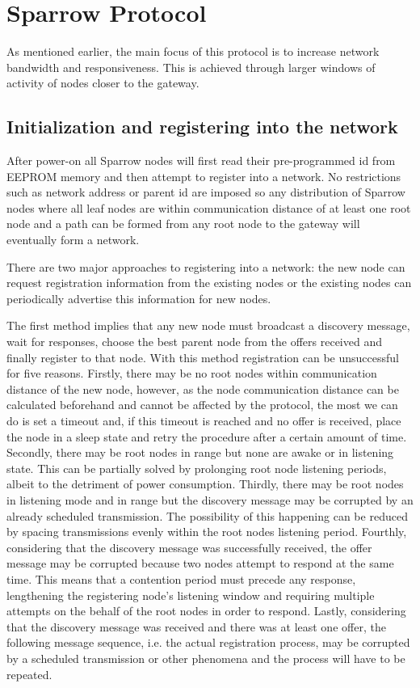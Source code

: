 
\chapter{Sparrow Protocol}


As mentioned earlier, the main focus of this protocol is to increase network
bandwidth and responsiveness. This is achieved through larger windows of
activity of nodes closer to the gateway. 

\section{Initialization and registering into the network}

After power-on all Sparrow nodes will first read their pre-programmed id from
EEPROM memory and then attempt to register into a network. No restrictions such
as network address or parent id are imposed so any distribution of Sparrow
nodes where all leaf nodes are within communication distance of at least one
root node and a path can be formed from any root node to the gateway will
eventually form a network. 

There are two major approaches to registering into a network: the new node can
request registration information from the existing nodes or the existing nodes
can periodically advertise this information for new nodes. 

The first method implies that any new node must broadcast a discovery message,
wait for responses, choose the best parent node from the offers received and
finally register to that node. With this method registration can be
unsuccessful for five reasons. Firstly, there may be no root nodes within
communication distance of the new node, however, as the node communication
distance can be calculated beforehand and cannot be affected by the protocol,
the most we can do is set a timeout and, if this timeout is reached and no
offer is received, place the node in a sleep state and retry the procedure
after a certain amount of time. Secondly, there may be root nodes in range but
none are awake or in listening state. This can be partially solved by
prolonging root node listening periods, albeit to the detriment of power
consumption. Thirdly, there may be root nodes in listening mode and in range
but the discovery message may be corrupted by an already scheduled
transmission. The possibility of this happening can be reduced by spacing
transmissions evenly within the root nodes listening period. Fourthly,
considering that the discovery message was successfully received, the offer
message may be corrupted because two nodes attempt to respond at the same time.
This means that a contention period must precede any response, lengthening the
registering node's listening window and requiring multiple attempts on the
behalf of the root nodes in order to respond. Lastly, considering that the
discovery message was received and there was at least one offer, the following
message sequence, i.e. the actual registration process, may be corrupted by a
scheduled transmission or other phenomena and the process will have to be
repeated.

